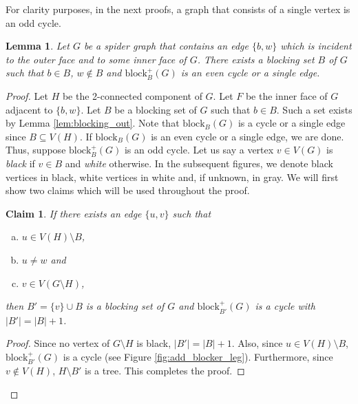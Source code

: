 \documentclass{patmorin}
\newcommand{\block}{\mathrm{block}}
\newtheorem{lemma}[theorem]{Lemma}
\newtheorem{claim}{Claim}[theorem]
\begin{document}
For clarity purposes, in the next proofs, a graph that consists of a single vertex is an odd cycle.


\begin{lemma}
 Let $G$ be a spider graph that contains an edge $\{b,w\}$ which is incident to the outer face and to some inner face of $G$. There exists a blocking set $B$ of $G$ such that $b \in B$, $w \notin B$ and $\block_{B}^+(G)$ is an even cycle or a single edge.
 \label{lem:cycle_spider_even}
\end{lemma}

\begin{proof}
 
Let $H$ be the 2-connected component of $G$. Let $F$ be the inner face of $G$ adjacent to $\{b,w\}$. Let $B$ be a blocking set of $G$ such that $b \in B$. Such a set exists by Lemma \ref{lem:blocking_out}. Note that $\block_B(G)$ is a cycle or a single edge since $B \subseteq V(H)$. If $\block_B(G)$ is an even cycle or a single edge, we are done. Thus, suppose $\block_B^+(G)$ is an odd cycle. Let us say a vertex $v \in V(G)$ is \emph{black} if $v \in B$ and \emph{white} otherwise. In the subsequent figures, we denote black vertices in black,  white vertices in white and, if unknown, in gray. We will first show two claims which will be used throughout the proof.
 
\begin{claim}
 If there exists an edge $\{u,v\}$ such that 
 \begin{enumerate}[a)]
  \item $u \in V(H)\setminus B$, 
  \item $u\not=w$ and 
  \item $v \in V(G\setminus H)$,
 \end{enumerate}
 then $B'=\{v\}\cup B$ is a blocking set of $G$ and $\block_{B'}^+(G)$ is a cycle with $|B'| = |B| +1$.
 \label{claim:add_blocker_leg}
\end{claim}
\begin{proof}
 Since no vertex of $G\setminus H$ is black, $|B'| = |B| +1$. Also, since $u \in V(H)\setminus B$, $\block_{B'}^+(G)$ is a cycle (see Figure \ref{fig:add_blocker_leg}).  Furthermore, since $v\notin V(H)$, $H\setminus B'$ is a tree. This completes the proof.
\end{proof}

\begin{figure}[!ht]
  \centering
  
\end{figure}
\end{proof}
\end{document}
